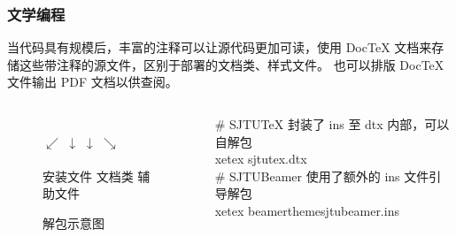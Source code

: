 \begin{frame}[fragile]
  \frametitle{文学编程}


  当代码具有规模后，丰富的注释可以让源代码更加可读，使用 Doc\TeX{} 文档来存储这些带注释的源文件，区别于部署的文档类、样式文件。
  也可以排版 Doc\TeX{} 文件输出 PDF 文档以供查阅。

  \begin{columns}
    \begin{column}{.4\textwidth}
      \begin{figure}
        \centering
        \\
        $\swarrow$ \quad $\downarrow$ \quad $\downarrow$ \quad $\searrow$\\
            \\[0.5ex]
        {\small 安装文件 文档类 \quad 辅助文件 \hspace*{2em}}
        \caption{\SJTUTeX{} 解包示意图}
      \end{figure}
    \end{column}
    \begin{column}{.5\textwidth}
      \begin{exampleblock}{\faTerminal}
        \ttfamily
        {\color{gray} \# SJTUTeX 封装了 ins 至 dtx 内部，可以自解包} \\
        xetex sjtutex.dtx \\
        {\color{gray} \# SJTUBeamer 使用了额外的 ins 文件引导解包}\\
        xetex beamerthemesjtubeamer.ins \\
      \end{exampleblock}
      
    \end{column}
  \end{columns}



\end{frame}

